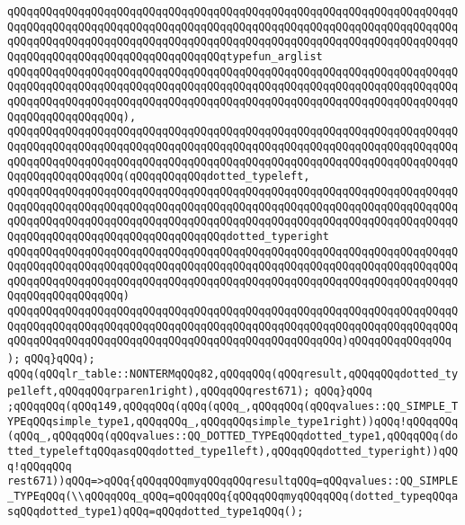 \verb|qQQqqQQqqQQqqQQqqQQqqQQqqQQqqQQqqQQqqQQqqQQqqQQqqQQqqQQqqQQqqQQqqQQqqQQqqQQqqQQqqQQqqQQqqQQqqQQqqQQqqQQqqQQqqQQqqQQqqQQqqQQqqQQqqQQqqQQqqQQqqQQqqQQqqQQqqQQqqQQqqQQqqQQqqQQqqQQqqQQqqQQqqQQqqQQqqQQqqQQqqQQqqQQqqQQqqQQqqQQqqQQqqQQqqQQqqQQqqQQqqQQqtypefun_arglist|\newline
\verb|qQQqqQQqqQQqqQQqqQQqqQQqqQQqqQQqqQQqqQQqqQQqqQQqqQQqqQQqqQQqqQQqqQQqqQQqqQQqqQQqqQQqqQQqqQQqqQQqqQQqqQQqqQQqqQQqqQQqqQQqqQQqqQQqqQQqqQQqqQQqqQQqqQQqqQQqqQQqqQQqqQQqqQQqqQQqqQQqqQQqqQQqqQQqqQQqqQQqqQQqqQQqqQQqqQQqqQQqqQQqqQQqqQQq),|\newline
\verb|qQQqqQQqqQQqqQQqqQQqqQQqqQQqqQQqqQQqqQQqqQQqqQQqqQQqqQQqqQQqqQQqqQQqqQQqqQQqqQQqqQQqqQQqqQQqqQQqqQQqqQQqqQQqqQQqqQQqqQQqqQQqqQQqqQQqqQQqqQQqqQQqqQQqqQQqqQQqqQQqqQQqqQQqqQQqqQQqqQQqqQQqqQQqqQQqqQQqqQQqqQQqqQQqqQQqqQQqqQQqqQQqqQQq(qQQqqQQqqQQqdotted_typeleft,|\newline
\verb|qQQqqQQqqQQqqQQqqQQqqQQqqQQqqQQqqQQqqQQqqQQqqQQqqQQqqQQqqQQqqQQqqQQqqQQqqQQqqQQqqQQqqQQqqQQqqQQqqQQqqQQqqQQqqQQqqQQqqQQqqQQqqQQqqQQqqQQqqQQqqQQqqQQqqQQqqQQqqQQqqQQqqQQqqQQqqQQqqQQqqQQqqQQqqQQqqQQqqQQqqQQqqQQqqQQqqQQqqQQqqQQqqQQqqQQqqQQqqQQqqQQqdotted_typeright|\newline
\verb|qQQqqQQqqQQqqQQqqQQqqQQqqQQqqQQqqQQqqQQqqQQqqQQqqQQqqQQqqQQqqQQqqQQqqQQqqQQqqQQqqQQqqQQqqQQqqQQqqQQqqQQqqQQqqQQqqQQqqQQqqQQqqQQqqQQqqQQqqQQqqQQqqQQqqQQqqQQqqQQqqQQqqQQqqQQqqQQqqQQqqQQqqQQqqQQqqQQqqQQqqQQqqQQqqQQqqQQqqQQqqQQqqQQq)|\newline
\verb|qQQqqQQqqQQqqQQqqQQqqQQqqQQqqQQqqQQqqQQqqQQqqQQqqQQqqQQqqQQqqQQqqQQqqQQqqQQqqQQqqQQqqQQqqQQqqQQqqQQqqQQqqQQqqQQqqQQqqQQqqQQqqQQqqQQqqQQqqQQqqQQqqQQqqQQqqQQqqQQqqQQqqQQqqQQqqQQqqQQqqQQqqQQqqQQq)qQQqqQQqqQQqqQQq|\newline
\verb|);|\newline
\verb|qQQq}qQQq);|\newline
\verb|qQQq(qQQqlr_table::NONTERMqQQq82,qQQqqQQq(qQQqresult,qQQqqQQqdotted_type1left,qQQqqQQqrparen1right),qQQqqQQqrest671);|\newline
\verb|qQQq}qQQq|\newline
\verb|;qQQqqQQq(qQQq149,qQQqqQQq(qQQq(qQQq_,qQQqqQQq(qQQqvalues::QQ_SIMPLE_TYPEqQQqsimple_type1,qQQqqQQq_,qQQqqQQqsimple_type1right))qQQq!qQQqqQQq(qQQq_,qQQqqQQq(qQQqvalues::QQ_DOTTED_TYPEqQQqdotted_type1,qQQqqQQq(dotted_typeleftqQQqasqQQqdotted_type1left),qQQqqQQqdotted_typeright))qQQq!qQQqqQQq|\newline
\verb|rest671))qQQq=>qQQq{qQQqqQQqmyqQQqqQQqresultqQQq=qQQqvalues::QQ_SIMPLE_TYPEqQQq(\\qQQqqQQq_qQQq=qQQqqQQq{qQQqqQQqmyqQQqqQQq(dotted_typeqQQqasqQQqdotted_type1)qQQq=qQQqdotted_type1qQQq();|\newline
